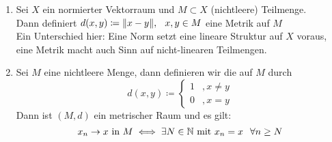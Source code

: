 \begin{beispiel}
	\begin{enumerate}[label=\alph*\upshape)]
		\item Sei $X$ ein normierter Vektorraum und $M \subset X$ (nichtleere) Teilmenge. \\
		Dann definiert $d(x, y) \coloneqq \| x - y\|, \hspace{0.25cm} x, y \in M$ eine Metrik auf $M$ \\
		Ein Unterschied hier: Eine Norm setzt eine lineare Struktur auf $X$ voraus, eine Metrik macht auch Sinn auf nicht-linearen Teilmengen.
		\item \label{bsp:1-diskreteMetrik} Sei $M$ eine nichtleere Menge, dann definieren wir die  auf $M$ durch
			\[ d(x, y) \coloneqq \begin{cases}1 &, x \neq y \\ 0 &, x = y\end{cases} \]
			Dann ist $(M, d)$ ein metrischer Raum und es gilt: 
				\[ x_{n} \rightarrow x \text{ in } M \iff \exists N \in \mathbb{N} \text{ mit } x_{n} = x \hspace{0.25cm} \forall n \geq N \]
	\end{enumerate}	
\end{beispiel}


